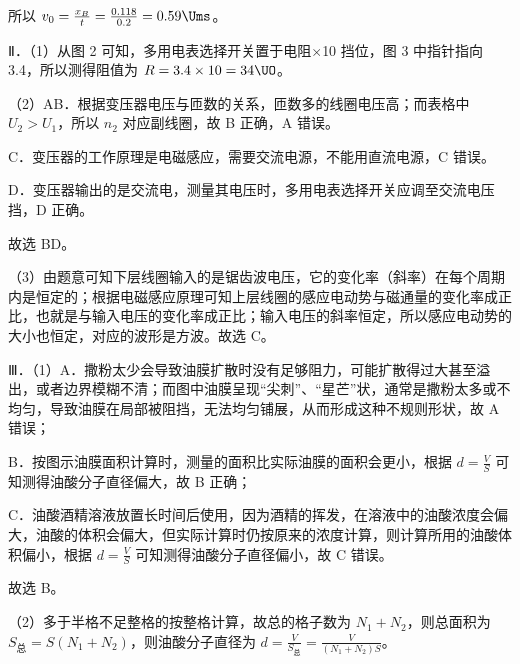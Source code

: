 \documentclass[\gkver]{gaokaozhenti}
\begin{document}
\begin{enumerate}
{所以 $v_{0}=\frac{x_{B}}{t}=\frac{0.118}{0.2}=0.59\Ums$。

Ⅱ．（1）从图 2 可知，多用电表选择开关置于电阻$\times$10 挡位，图 3 中指针指向 3.4，所以测得阻值为 $R=3.4\times10=34\UO$。

（2）AB．根据变压器电压与匝数的关系，匝数多的线圈电压高；而表格中 $U_{2} > U_{1}$，所以 $n_{2}$ 对应副线圈，故 B 正确，A 错误。

C．变压器的工作原理是电磁感应，需要交流电源，不能用直流电源，C 错误。

D．变压器输出的是交流电，测量其电压时，多用电表选择开关应调至交流电压挡，D 正确。

故选 BD。

（3）由题意可知下层线圈输入的是锯齿波电压，它的变化率（斜率）在每个周期内是恒定的；根据电磁感应原理可知上层线圈的感应电动势与磁通量的变化率成正比，也就是与输入电压的变化率成正比；输入电压的斜率恒定，所以感应电动势的大小也恒定，对应的波形是方波。故选 C。

Ⅲ．（1）A．撒粉太少会导致油膜扩散时没有足够阻力，可能扩散得过大甚至溢出，或者边界模糊不清；而图中油膜呈现“尖刺”、“星芒”状，通常是撒粉太多或不均匀，导致油膜在局部被阻挡，无法均匀铺展，从而形成这种不规则形状，故 A 错误；

B．按图示油膜面积计算时，测量的面积比实际油膜的面积会更小，根据 $d=\frac{V}{S}$ 可知测得油酸分子直径偏大，故 B 正确；

C．油酸酒精溶液放置长时间后使用，因为酒精的挥发，在溶液中的油酸浓度会偏大，油酸的体积会偏大，但实际计算时仍按原来的浓度计算，则计算所用的油酸体积偏小，根据 $d=\frac{V}{S}$ 可知测得油酸分子直径偏小，故 C 错误。

故选 B。

（2）多于半格不足整格的按整格计算，故总的格子数为 $N_{1} + N_{2}$，则总面积为 $S_{\text{总}} = S(N_{1} + N_{2})$，则油酸分子直径为 $d = \frac{V}{S_{\text{总}}} = \frac{V}{(N_{1} + N_{2})S}$。
}


\end{enumerate}
\end{document}
